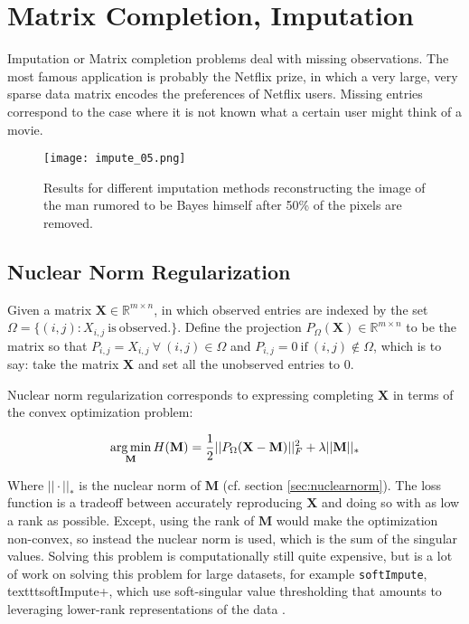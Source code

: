 \section{Matrix Completion, Imputation}
Imputation or Matrix completion problems deal with missing observations. The most famous application is probably the Netflix prize, in which a very large, very sparse data matrix encodes the preferences of Netflix users. Missing entries correspond to the case where it is not known what a certain user might think of a movie.

\begin{figure}
\centering
    \texttt{[image: impute\_05.png]}
    \caption{Results for different imputation methods reconstructing the image of the man rumored to be Bayes himself after 50\% of the pixels are removed.}
    \label{fig:impute_05}
\end{figure}


\subsection{Nuclear Norm Regularization}
Given a matrix $\mathbf{X}\in\mathbb{R}^{m\times n}$, in which observed entries are indexed by the set $\Omega = \{(i,j) : X_{i,j}\mathrm{\ is\ observed.} \}$\cite{hastie2015matrix}. Define the projection $P_{\Omega}(\mathbf{X}) \in \mathbb{R}^{m\times n}$ to be the matrix so that $P_{i,j} = X_{i,j}\ \forall\ (i,j) \in \Omega$ and $P_{i,j} = 0\ \mathrm{if\ }(i,j)\notin\Omega$, which is to say: take the matrix $\mathbf{X}$ and set all the unobserved entries to $0$. 

Nuclear norm regularization corresponds to expressing completing $\mathbf{X}$ in terms of the convex optimization problem:

\begin{equation}
\operatorname*{arg\,min}_{\mathbf{M}} H(\mathbf{M}) = \frac{1}{2}||P_{\Omega}(\mathbf{X-M})||^2_F + \lambda ||\mathbf{M}||_{*}
\end{equation}

Where $||\cdot||_{*}$ is the nuclear norm of $\mathbf{M}$ (cf. section \ref{sec:nuclearnorm}). The loss function is a tradeoff between accurately reproducing $\mathbf{X}$ and doing so with as low a rank as possible. Except, using the rank of $\mathbf{M}$ would make the optimization non-convex, so instead the nuclear norm is used, which is the sum of the singular values. Solving this problem is computationally still quite expensive, but is a lot of work on solving this problem for large datasets, for example \texttt{softImpute}, texttt{softImpute+}, which use soft-singular value thresholding that amounts to leveraging lower-rank representations of the data \cite{mazumder2010spectral}.